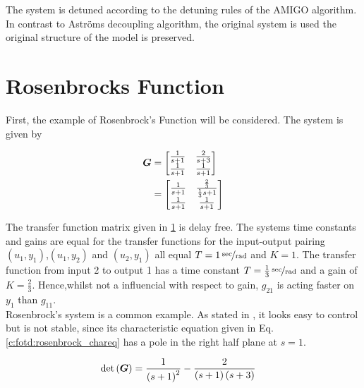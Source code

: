 The system is detuned according to the detuning rules of the AMIGO algorithm. In contrast to Astr\"oms decoupling algorithm, the original system is used the original structure of the model is preserved.

\newpage
\section{Rosenbrocks Function}%
\label{c:fotd:s:rosenbrook}

First, the example of Rosenbrock's Function will be considered. The system is given by

\begin{align}
\begin{split}
\mbox{\boldmath$G$} &= \begin{bmatrix}
\frac{1}{s+1} & \frac{2}{s+3} \\
\frac{1}{s+1} & \frac{1}{s+1}
\end{bmatrix}
\\
&=\begin{bmatrix}
\frac{1}{s+1} & \frac{\frac{2}{3}}{\frac{1}{3}s+1} \\
\frac{1}{s+1} & \frac{1}{s+1}
\end{bmatrix} 
\end{split}
\label{c:fotd:e:rosenbrock_sys}
\end{align}

The transfer function matrix given in \ref{c:fotd:s:rosenbrook} is delay free. The systems time constants and gains are equal for the transfer functions for the input-output pairing  $(u_1, y_1)$,$(u_1,y_2)$ and $(u_2,y_1)$ all equal $T = \unitfrac[1]{sec}{rad}$ and $K = 1$. The transfer function from input 2 to output 1 has a time constant $T = \unitfrac[\frac{1}{3}]{sec}{rad}$ and a gain of $K = \frac{2}{3}$. Hence,whilst not a influencial with respect to gain, $g_{21}$ is acting faster on $y_1$ than $g_{11}$.\\ 

Rosenbrock's system is a common example. As stated in \cite{Astrom2001a}, it looks easy to control but is not stable, since its characteristic equation given in Eq. \ref{c:fotd:rosenbrock_chareq} has a pole in the right half plane at $s=1$.

\begin{align}
\begin{split}
\det\left( \mbox{\boldmath$G$} \right) &= \frac{1}{\left( s + 1\right)^2} - \frac{2}{\left( s + 1\right) \left( s + 3\right)}
\end{split}
\label{c:fotd:rosenbrock_chareq}
\end{align}

